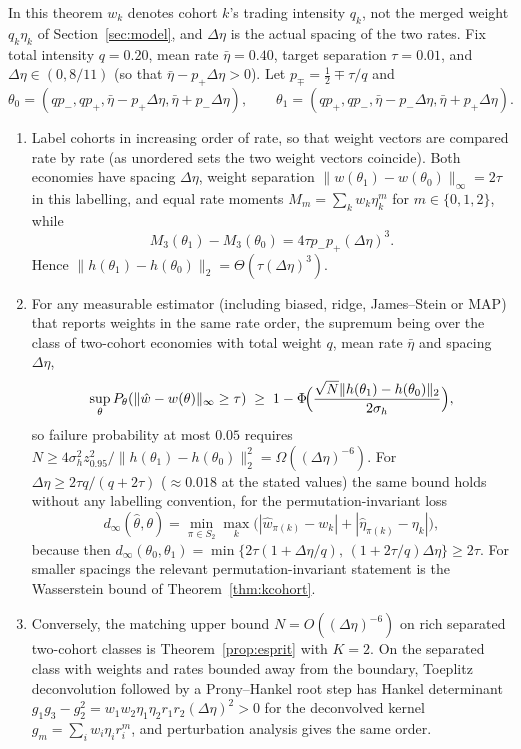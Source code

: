 \begin{theorem}[Global two-point bound and matching upper bound, $K=2$]\label{thm:twocohort}
In this theorem $w_k$ denotes cohort $k$'s trading intensity $q_k$, not the merged weight $q_k\eta_k$ of Section~\ref{sec:model}, and $\Delta\eta$ is the actual spacing of the two rates. Fix total intensity $q=0.20$, mean rate $\bar\eta=0.40$, target separation $\tau=0.01$, and $\Delta\eta\in(0,8/11)$ (so that $\bar\eta-p_+\Delta\eta>0$). Let $p_\mp=\tfrac12\mp\tau/q$ and
\begin{equation}\label{eq:pair}
\theta_0=(qp_-,qp_+,\bar\eta-p_+\Delta\eta,\bar\eta+p_-\Delta\eta),\qquad\theta_1=(qp_+,qp_-,\bar\eta-p_-\Delta\eta,\bar\eta+p_+\Delta\eta).
\end{equation}
\begin{enumerate}[label=(\roman*)]
\item Label cohorts in increasing order of rate, so that weight vectors are compared rate by rate (as unordered sets the two weight vectors coincide). Both economies have spacing $\Delta\eta$, weight separation $\|w(\theta_1)-w(\theta_0)\|_\infty=2\tau$ in this labelling, and equal rate moments $M_m=\sum_kw_k\eta_k^m$ for $m\in\{0,1,2\}$, while
\begin{equation}\label{eq:dM3}
M_3(\theta_1)-M_3(\theta_0)=4\tau p_-p_+(\Delta\eta)^3 .
\end{equation}
Hence $\|h(\theta_1)-h(\theta_0)\|_2=\Theta(\tau(\Delta\eta)^3)$.
\item For any measurable estimator (including biased, ridge, James--Stein or MAP) that reports weights in the same rate order, the supremum being over the class of two-cohort economies with total weight $q$, mean rate $\bar\eta$ and spacing $\Delta\eta$,
\begin{equation}\label{eq:lecam2}
\sup_\theta P_\theta(\|\hat w-w(\theta)\|_\infty\ge\tau)\;\ge\;1-\Phi\!\Bigl(\frac{\sqrt N\|h(\theta_1)-h(\theta_0)\|_2}{2\sigma_h}\Bigr),
\end{equation}
so failure probability at most $0.05$ requires $N\ge4\sigma_h^2z_{0.95}^2/\|h(\theta_1)-h(\theta_0)\|_2^2=\Omega((\Delta\eta)^{-6})$. For $\Delta\eta\ge2\tau q/(q+2\tau)$ ($\approx0.018$ at the stated values) the same bound holds without any labelling convention, for the permutation-invariant loss
\[
d_\infty(\hat\theta,\theta)=\min_{\pi\in S_2}\max_{k}\bigl(|\hat w_{\pi(k)}-w_k|+|\hat\eta_{\pi(k)}-\eta_k|\bigr),
\]
because then $d_\infty(\theta_0,\theta_1)=\min\{2\tau(1+\Delta\eta/q),\,(1+2\tau/q)\Delta\eta\}\ge2\tau$. For smaller spacings the relevant permutation-invariant statement is the Wasserstein bound of Theorem~\ref{thm:kcohort}.
\item Conversely, the matching upper bound $N=O((\Delta\eta)^{-6})$ on rich separated two-cohort classes is Theorem~\ref{prop:esprit} with $K=2$. On the separated class with weights and rates bounded away from the boundary, Toeplitz deconvolution followed by a Prony--Hankel root step has Hankel determinant $g_1g_3-g_2^2=w_1w_2\eta_1\eta_2r_1r_2(\Delta\eta)^2>0$ for the deconvolved kernel $g_m=\sum_iw_i\eta_ir_i^m$, and perturbation analysis gives the same order.
\end{enumerate}
\end{theorem}

